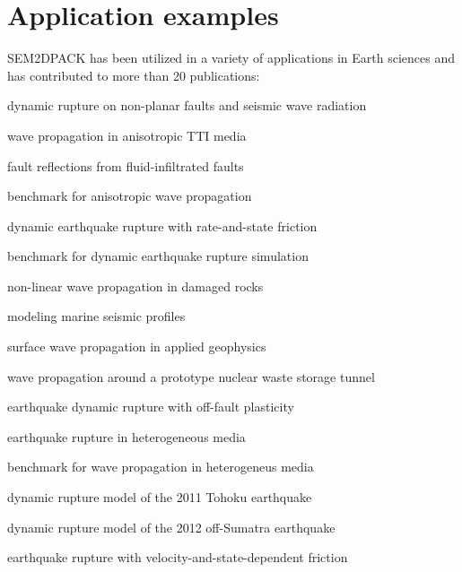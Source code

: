 \section{Application examples}

SEM2DPACK has been utilized in a variety of applications in Earth sciences
and has contributed to more than 20 publications:

\begin{sitemize}
  \item dynamic rupture on non-planar faults and seismic wave radiation  
  \item wave propagation in anisotropic TTI media 
  \item fault reflections from fluid-infiltrated faults 
  \item benchmark for anisotropic wave propagation 
  \item dynamic earthquake rupture with rate-and-state friction  
  \item benchmark for dynamic earthquake rupture simulation  
  \item non-linear wave propagation in damaged rocks  
  \item modeling marine seismic profiles 
  \item surface wave propagation in applied geophysics  
  \item wave propagation around a prototype nuclear waste storage tunnel  
  \item earthquake dynamic rupture with off-fault plasticity  
  \item earthquake rupture in heterogeneous media  
  \item benchmark for wave propagation in heterogeneus media 
  \item dynamic rupture model of the 2011 Tohoku earthquake  
  \item dynamic rupture model of the 2012 off-Sumatra earthquake  
  \item earthquake rupture with velocity-and-state-dependent friction  

\end{sitemize}

